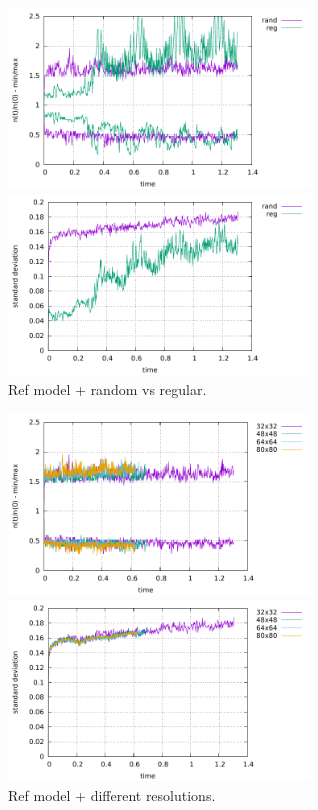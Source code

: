 \begin{center}
\includegraphics[width=8cm]{python_codes/fieldstone_30/results_box/markercount_reg}
\includegraphics[width=8cm]{python_codes/fieldstone_30/results_box/stdev_reg}\\
{\captionfont Ref model + random vs regular.} 
\end{center}

\begin{center}
\includegraphics[width=8cm]{python_codes/fieldstone_30/results_box/markercount_res}
\includegraphics[width=8cm]{python_codes/fieldstone_30/results_box/stdev_res}\\
{\captionfont Ref model + different resolutions.}
\end{center}

